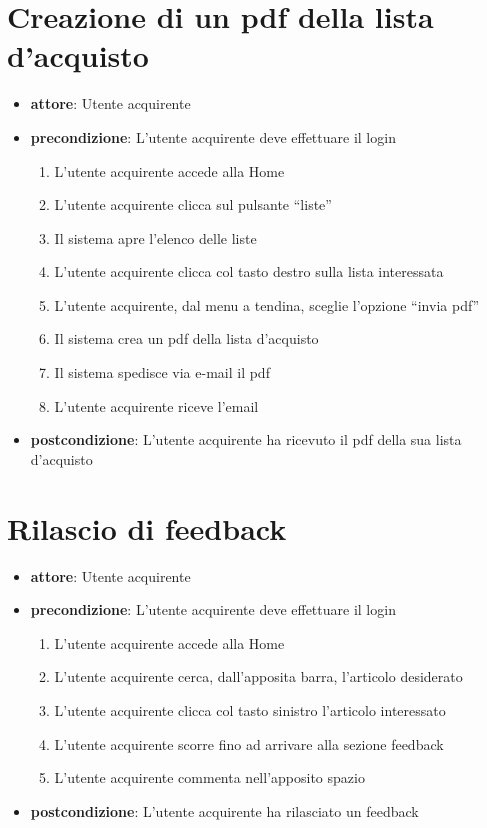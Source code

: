 \section{Creazione di un pdf della lista d’acquisto}
\begin{itemize}
    \item \textbf{attore}: Utente acquirente
    \item \textbf{precondizione}: L’utente acquirente deve effettuare il login
    
    \begin{enumerate}
        \item L’utente acquirente accede alla Home
        \item L’utente acquirente clicca sul pulsante “liste”
        \item Il sistema apre l’elenco delle liste
        \item L’utente acquirente clicca col tasto destro sulla lista interessata
        \item L’utente acquirente, dal menu a tendina, sceglie l’opzione “invia pdf”
        \item Il sistema crea un pdf della lista d’acquisto
        \item Il sistema spedisce via e-mail il pdf
        \item L’utente acquirente riceve l’email
    \end{enumerate}

    \item \textbf{postcondizione}: L’utente acquirente ha ricevuto il pdf della sua lista d’acquisto
\end{itemize}


\section{Rilascio di feedback}
\begin{itemize}
    \item \textbf{attore}: Utente acquirente
    \item \textbf{precondizione}: L’utente acquirente deve effettuare il login 

    \begin{enumerate}
        \item L’utente acquirente accede alla Home
        \item L’utente acquirente cerca, dall’apposita barra, l’articolo desiderato
        \item L’utente acquirente clicca col tasto sinistro l’articolo interessato
        \item L’utente acquirente scorre fino ad arrivare alla sezione feedback
        \item L’utente acquirente commenta nell’apposito spazio
    \end{enumerate}

    \item \textbf{postcondizione}: L’utente acquirente ha rilasciato un feedback
\end{itemize}
